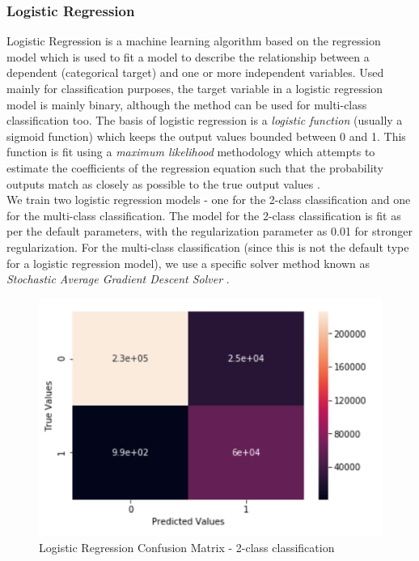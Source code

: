 \subsubsection{Logistic Regression}
Logistic Regression is a machine learning algorithm based on the regression model which is used to fit a model to describe the relationship between a dependent (categorical target) and one or more independent variables. Used mainly for classification purposes, the target variable in a logistic regression model is mainly binary, although the method can be used for multi-class classification too. The basis of logistic regression is a {\em logistic function} (usually a sigmoid function) which keeps the output values bounded between 0 and 1. This function is fit using a {\em maximum likelihood} methodology which attempts to estimate the coefficients of the regression equation such that the probability outputs match as closely as possible to the true output values \cite{islr09}.\\
We train two logistic regression models - one for the 2-class classification and one for the multi-class classification. The model for the 2-class classification is fit as per the default parameters, with the regularization parameter as 0.01 for stronger regularization. For the multi-class classification (since this is not the default type for a logistic regression model), we use a specific solver method known as {\em Stochastic Average Gradient Descent Solver} \cite{scikit12}.
\begin{figure}
	\includegraphics[width=1.0\columnwidth]{images/logreg2.PNG}
	\caption{Logistic Regression Confusion Matrix - 2-class classification}
	\label{F:logreg2}
\end{figure}
